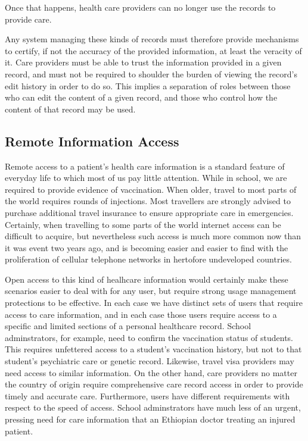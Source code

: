 \documentclass[10pt, conference, compsocconf]{IEEEtran}
\begin{document}
Once that happens, health care providers can no longer use the records to provide care.

Any system managing these kinds of records must therefore provide mechanisms to certify, if not the accuracy of the provided information, at least the veracity of it.  Care providers must be able to trust the information provided in a given record, and must not be required to shoulder the burden of viewing the record's edit history in order to do so.  This implies a separation of roles between those who can edit the content of a given record, and those who control how the content of that record may be used.

\subsection{Remote Information Access}
Remote access to a patient's health care information is a standard feature of everyday life to which most of us pay little attention.  While in school, we are required to provide evidence of vaccination.  When older, travel to most parts of the world requires rounds of injections.  Most travellers are strongly advised to purchase additional travel insurance to ensure appropriate care in emergencies.  Certainly, when travelling to some parts of the world internet access can be difficult to acquire, but nevertheless such access is much more common now than it was event two years ago, and is becoming easier and easier to find with the proliferation of cellular telephone networks in hertofore undeveloped countries.  

Open access to this kind of healhcare information would certainly make these scenarios easier to deal with for any user, but require strong usage management protections to be effective.  In each case we have distinct sets of users that require access to care information, and in each case those users require access to a specific and limited sections of a personal healthcare record.  School adminstrators, for example, need to confirm the vaccination status of students.  This requires unfettered access to a student's vaccination history, but not to that student's psychiatric care or genetic record.  Likewise, travel visa providers may need access to similar information.  On the other hand, care providers no matter the country of origin require comprehensive care record access in order to provide timely and accurate care.  Furthermore, users have different requirements with respect to the speed of access.  School adminstrators have much less of an urgent, pressing need for care information that an Ethiopian doctor treating an injured patient.  
\end{document}
